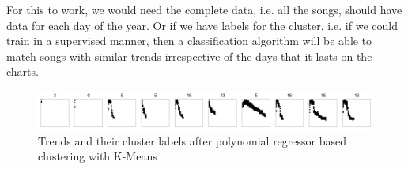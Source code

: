 \begin{appendix}
For this to work, we would need the complete data, i.e. all the songs, should have data for each day of the year. Or if we have labels for the cluster, i.e. if we could train in a supervised manner, then a classification algorithm will be able to match songs with similar trends irrespective of the days that it lasts on the charts.
\begin{figure}[h]
\centering
\centerline{\includegraphics[width=\textwidth]{Outputs/resultploy.png}}
\caption{Trends and their cluster labels after polynomial regressor based clustering with K-Means}
\label{fig:polyout}
\end{figure}

\begin{table}[!hbt]
    \centering
    \caption{Experiment results for the two feature engineering methods with K-Means. SS is silhouette score, DB is Davies–Bouldin index, CH is Calinski Harabasz score.}
    \label{tab:table4}
\end{table} 
\end{appendix}